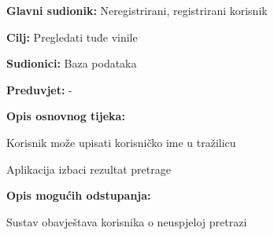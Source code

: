 				\noindent {}
					\begin{packed_item}
	
						\item \textbf{Glavni sudionik: }Neregistrirani, registrirani korisnik
						\item  \textbf{Cilj:} Pregledati tuđe vinile
						\item  \textbf{Sudionici:} Baza podataka
						\item  \textbf{Preduvjet:} -
						\item  \textbf{Opis osnovnog tijeka:}
						
						\item[] \begin{packed_enum}
	
							\item Korisnik može upisati korisničko ime u tražilicu
							\item Aplikacija izbaci rezultat pretrage

						\end{packed_enum}
						
						\item  \textbf{Opis mogućih odstupanja:}
						
						\item[] \begin{packed_item}
	
							\item[2.a] Sustav obavještava korisnika o neuspjeloj pretrazi 
							
						\end{packed_item}					
					\end{packed_item}
					
